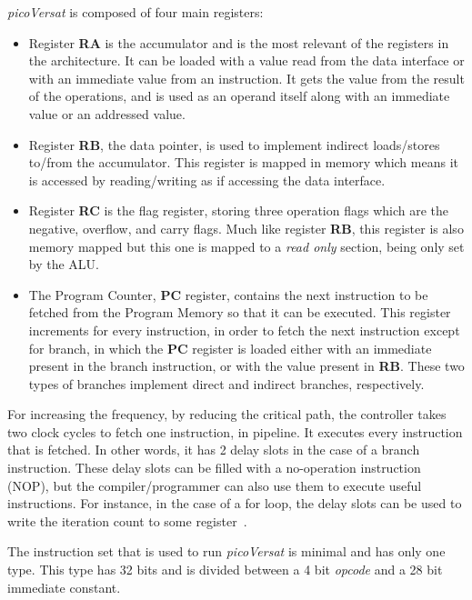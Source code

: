 \documentclass[journal]{IEEEtran}
\begin{document}
{\it picoVersat} is composed of four main registers:
\begin{itemize}\item
Register {\bf RA} is the accumulator and is the most relevant of the registers
in the architecture.  It can be loaded with a value read from the data interface
or with an immediate value from an instruction.  It gets the value from the
result of the operations, and is used as an operand itself along with an
immediate value or an addressed value.
\item
Register {\bf RB}, the data pointer, is used to implement indirect loads/stores
to/from the accumulator.  This register is mapped in memory which means it is
accessed by reading/writing as if accessing the data interface.
\item
Register {\bf RC} is the flag register, storing three operation flags which are
the negative, overflow, and carry flags.  Much like register {\bf RB}, this
register is also memory mapped but this one is mapped to a {\it read only}
section, being only set by the {\sc ALU}.
\item
The Program Counter, {\bf PC} register, contains the next instruction to be
fetched from the Program Memory so that it can be executed.  This register
increments for every instruction, in order to fetch the next instruction except
for branch, in which the {\bf PC} register is loaded either with an immediate
present in the branch instruction, or with the value present in {\bf RB}.  These
two types of branches implement direct and indirect branches, respectively.
\end{itemize}

For increasing the frequency, by reducing the critical path, the controller
takes two clock cycles to fetch one instruction, in pipeline.  It executes every
instruction that is fetched.  In other words, it has 2 delay slots in the case
of a branch instruction.  These delay slots can be filled with a no-operation
instruction ({\sc NOP}), but the compiler/programmer can also use them to
execute useful instructions.  For instance, in the case of a for loop, the delay
slots can be used to write the iteration count to some
register~\cite{Lopes2017}.


The instruction set that is used to run {\it picoVersat} is minimal and has only
one type.  This type has 32 bits and is divided between a 4 bit {\it opcode}
and a 28 bit immediate constant.
\end{document}
